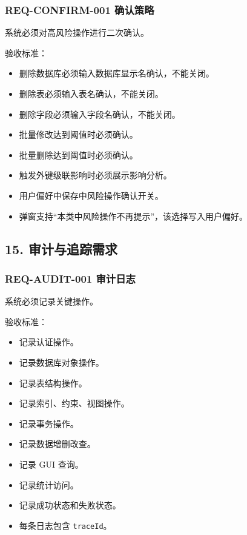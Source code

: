 \documentclass[
  a4paper,
  UTF8]{ctexart}
\providecommand{\tightlist}{%
  \setlength{\itemsep}{0pt}\setlength{\parskip}{0pt}}
\begin{document}
\hypertarget{req-confirm-001-ux786eux8ba4ux7b56ux7565}{%
\subsubsection{REQ-CONFIRM-001
确认策略}\label{req-confirm-001-ux786eux8ba4ux7b56ux7565}}

系统必须对高风险操作进行二次确认。

验收标准：

\begin{itemize}
\tightlist
\item
  删除数据库必须输入数据库显示名确认，不能关闭。
\item
  删除表必须输入表名确认，不能关闭。
\item
  删除字段必须输入字段名确认，不能关闭。
\item
  批量修改达到阈值时必须确认。
\item
  批量删除达到阈值时必须确认。
\item
  触发外键级联影响时必须展示影响分析。
\item
  用户偏好中保存中风险操作确认开关。
\item
  弹窗支持``本类中风险操作不再提示''，该选择写入用户偏好。
\end{itemize}

\hypertarget{ux5ba1ux8ba1ux4e0eux8ffdux8e2aux9700ux6c42}{%
\subsection{15.
审计与追踪需求}\label{ux5ba1ux8ba1ux4e0eux8ffdux8e2aux9700ux6c42}}

\hypertarget{req-audit-001-ux5ba1ux8ba1ux65e5ux5fd7}{%
\subsubsection{REQ-AUDIT-001
审计日志}\label{req-audit-001-ux5ba1ux8ba1ux65e5ux5fd7}}

系统必须记录关键操作。

验收标准：

\begin{itemize}
\tightlist
\item
  记录认证操作。
\item
  记录数据库对象操作。
\item
  记录表结构操作。
\item
  记录索引、约束、视图操作。
\item
  记录事务操作。
\item
  记录数据增删改查。
\item
  记录 GUI 查询。
\item
  记录统计访问。
\item
  记录成功状态和失败状态。
\item
  每条日志包含 \texttt{traceId}。
\end{itemize}
\end{document}
